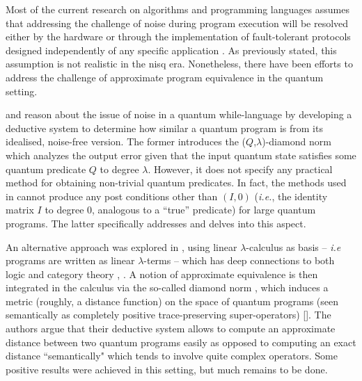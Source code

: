 Most of the current research on algorithms and programming languages assumes that addressing the challenge of noise during program execution will be resolved either by the hardware or through the implementation of fault-tolerant protocols designed independently of any specific application \cite{chong2017programming}. As previously stated, this assumption is not realistic in the \acrshort{nisq} era. Nonetheless, there have been efforts to address the challenge of approximate program equivalence in the quantum setting. 

\cite{hung2019quantitative} and \cite{tao2021gleipnir} reason about the issue of noise in a quantum while-language by developing a deductive system to determine how similar a quantum program is from its idealised, noise-free version. The former introduces the ($Q$,$\lambda$)-diamond norm which analyzes the output error given that the input quantum state satisfies some quantum predicate $Q$ to degree $\lambda$. However, it does not specify any practical method for obtaining non-trivial quantum predicates. In fact, the methods used in \cite{hung2019quantitative} cannot produce any post conditions other than $(I,0)$ (\textit{i.e.}, the identity matrix $I$ to degree 0, analogous to a ``true” predicate) for large quantum programs. The latter specifically addresses and delves into this aspect.  

An alternative approach was explored in \cite{dahlqvist2022syntactic}, using linear $\lambda$-calculus as basis – \textit{i.e} programs are written as linear $\lambda$-terms – which has deep connections to both logic and category theory \cite{girard1995advances}, \cite{benton1994mixed}. A notion of approximate equivalence is then
integrated in the calculus via the so-called diamond norm , which induces a metric (roughly, a distance function) on the space of quantum programs (seen semantically as completely positive trace-preserving super-operators) [\cite{watrous2018theory}]. The authors argue that their deductive system allows to compute an approximate distance between two quantum programs easily as opposed to computing an exact distance ``semantically" which tends to involve quite complex operators.  Some positive results were achieved in this setting, but much remains to be done.




